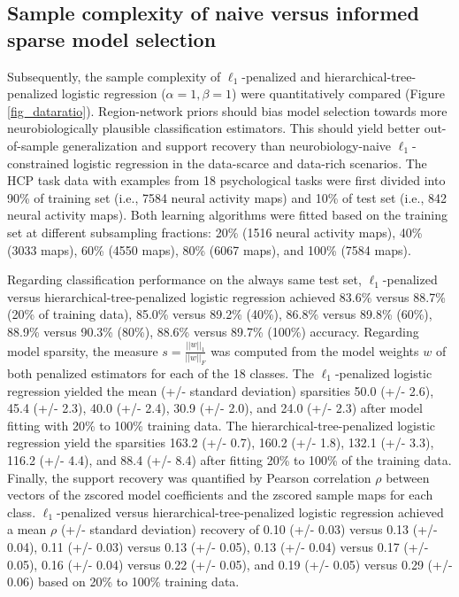 \documentclass{article}
\begin{document}
\subsection{Sample complexity of naive versus informed sparse model selection}
Subsequently, the sample complexity of
$\ell_1$-penalized and hierarchical-tree-penalized logistic regression
($\alpha = 1, \beta = 1$)
were quantitatively compared (Figure \ref{fig_dataratio}).
Region-network priors should bias model selection towards more
neurobiologically plausible classification estimators.
This should yield better out-of-sample generalization and
support recovery than
neurobiology-naive $\ell_1$-constrained logistic regression
in the data-scarce and data-rich scenarios.
%
The HCP task data with examples from 18
psychological tasks were first divided into
90\% of training set (i.e., 7584 neural activity maps) and
10\% of test set (i.e., 842 neural activity maps).
Both learning algorithms were fitted based on the
training set at different subsampling fractions:
20\% (1516 neural activity maps),
40\% (3033 maps),
60\% (4550 maps),
80\% (6067 maps), and
100\% (7584 maps).

Regarding classification performance on the always same test set,
$\ell_1$-penalized versus hierarchical-tree-penalized logistic regression
achieved
83.6\% versus 88.7\% (20\% of training data),
85.0\% versus 89.2\% (40\%),
86.8\% versus 89.8\% (60\%),
88.9\% versus 90.3\% (80\%),
88.6\% versus 89.7\% (100\%) accuracy.
Regarding model sparsity,
the measure $s = \frac{||w||_1}{||w||_F}$ was computed from
the model weights $w$ of both penalized estimators
for each of the 18 classes.
The $\ell_1$-penalized logistic regression
yielded the mean (+/- standard deviation) sparsities
50.0 (+/- 2.6), 45.4 (+/- 2.3), 40.0 (+/- 2.4), 30.9 (+/- 2.0), and 24.0 (+/- 2.3)
after model fitting with 20\% to 100\% training data.
The hierarchical-tree-penalized logistic regression
yield the sparsities
163.2 (+/- 0.7), 160.2 (+/- 1.8), 132.1 (+/- 3.3), 116.2 (+/- 4.4), and 88.4 (+/- 8.4)
after fitting 20\% to 100\% of the training data.
Finally, the support recovery was quantified by
Pearson correlation $\rho$ between vectors of
the zscored model coefficients
and
the zscored sample maps for each class.
$\ell_1$-penalized versus hierarchical-tree-penalized logistic regression
achieved a mean $\rho$ (+/- standard deviation) recovery of
0.10 (+/- 0.03) versus 0.13 (+/- 0.04),
0.11 (+/- 0.03) versus 0.13 (+/- 0.05),
0.13 (+/- 0.04) versus 0.17 (+/- 0.05),
0.16 (+/- 0.04) versus 0.22 (+/- 0.05), and
0.19 (+/- 0.05) versus 0.29 (+/- 0.06)
based on 20\% to 100\% training data.
\end{document}
